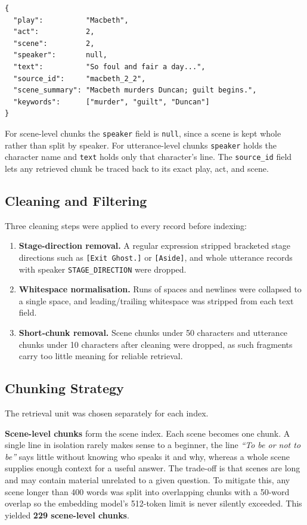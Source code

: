 \begin{lstlisting}
{
  "play":          "Macbeth",
  "act":           2,
  "scene":         2,
  "speaker":       null,
  "text":          "So foul and fair a day...",
  "source_id":     "macbeth_2_2",
  "scene_summary": "Macbeth murders Duncan; guilt begins.",
  "keywords":      ["murder", "guilt", "Duncan"]
}
\end{lstlisting}

For scene-level chunks the \texttt{speaker} field is \texttt{null}, since
a scene is kept whole rather than split by speaker. For utterance-level
chunks \texttt{speaker} holds the character name and \texttt{text} holds
only that character's line. The \texttt{source\_id} field lets any
retrieved chunk be traced back to its exact play, act, and scene.

\subsection{Cleaning and Filtering}
Three cleaning steps were applied to every record before indexing:
\begin{enumerate}
  \item \textbf{Stage-direction removal.} A regular expression stripped
  bracketed stage directions such as \texttt{[Exit Ghost.]} or
  \texttt{[Aside]}, and whole utterance records with speaker
  \texttt{STAGE\_DIRECTION} were dropped.
  \item \textbf{Whitespace normalisation.} Runs of spaces and newlines
  were collapsed to a single space, and leading/trailing whitespace was
  stripped from each text field.
  \item \textbf{Short-chunk removal.} Scene chunks under 50 characters
  and utterance chunks under 10 characters after cleaning were dropped,
  as such fragments carry too little meaning for reliable retrieval.
\end{enumerate}

\subsection{Chunking Strategy}
The retrieval unit was chosen separately for each index.

\textbf{Scene-level chunks} form the scene index. Each scene becomes one
chunk. A single line in isolation rarely makes sense to a beginner, the
line \emph{``To be or not to be''} says little without knowing who speaks
it and why, whereas a whole scene supplies enough context for a useful
answer. The trade-off is that scenes are long and may contain material
unrelated to a given question. To mitigate this, any scene longer than
400 words was split into overlapping chunks with a 50-word overlap so the
embedding model's 512-token limit is never silently exceeded. This
yielded \textbf{229 scene-level chunks}.


